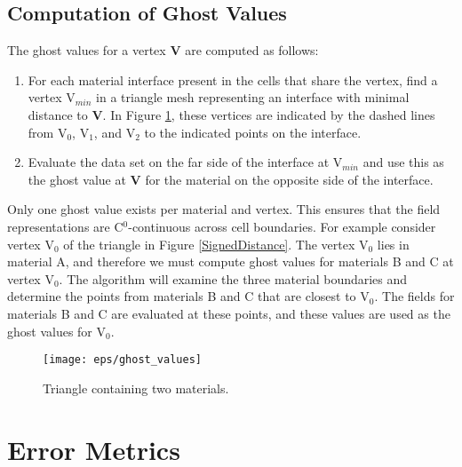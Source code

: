 \documentclass{siggraph}
\begin{document}
\subsection{Computation of Ghost Values}
The ghost values for a vertex {\bf{V}} are computed as follows:


\begin{enumerate}
\item For each material interface present in the cells that share the
vertex, find a vertex V$_{min}$ in a triangle mesh representing an
interface with minimal distance to {\bf{V}}.  In Figure
\ref{GhostValues}, these vertices are indicated by the dashed lines
from V$_{0}$, V$_{1}$, and V$_{2}$ to the indicated points on the
interface.


\item Evaluate the data set on the far side of the interface at
V$_{min}$ and use this as the ghost value at {\bf{V}} for the material
on the opposite side of the interface.


\end{enumerate}
Only one ghost value exists per material and vertex.  This ensures
that the field representations are C$^{0}$-continuous across cell
boundaries.  For example consider vertex V$_{0}$ of the triangle in
Figure \ref{SignedDistance}.  The vertex V$_{0}$ lies in material A,
and therefore we must compute ghost values for materials B and C at
vertex V$_{0}$.  The algorithm will examine the three material
boundaries and determine the points from materials B and C that are
closest to V$_{0}$.  The fields for materials B and C are evaluated at
these points, and these values are used as the ghost values for
V$_{0}$.


\begin{figure}
\begin{center}
\texttt{[image: eps/ghost\_values]}
\caption{Triangle containing two materials.}
\label{GhostValues}
\end{center}
\end{figure}


\section{Error Metrics}
\end{document}
